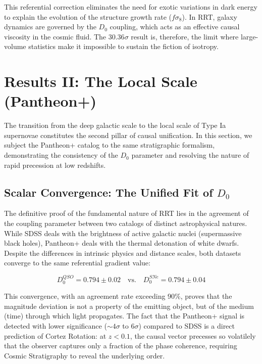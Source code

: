 \documentclass[12pt, a4paper]{article}
\begin{document}
This referential correction eliminates the need for exotic variations in dark energy to explain the evolution of the structure growth rate ($f\sigma_8$). In RRT, galaxy dynamics are governed by the $D_0$ coupling, which acts as an effective causal viscosity in the cosmic fluid. The $30.36\sigma$ result is, therefore, the limit where large-volume statistics make it impossible to sustain the fiction of isotropy.

\section{Results II: The Local Scale (Pantheon+)}

The transition from the deep galactic scale to the local scale of Type Ia supernovae constitutes the second pillar of causal unification. In this section, we subject the Pantheon+ catalog to the same stratigraphic formalism, demonstrating the consistency of the $D_0$ parameter and resolving the nature of rapid precession at low redshifts.

\subsection{Scalar Convergence: The Unified Fit of \texorpdfstring{$D_0$}{D0}}

The definitive proof of the fundamental nature of RRT lies in the agreement of the coupling parameter between two catalogs of distinct astrophysical natures. While SDSS deals with the brightness of active galactic nuclei (supermassive black holes), Pantheon+ deals with the thermal detonation of white dwarfs. Despite the differences in intrinsic physics and distance scales, both datasets converge to the same referential gradient value:

\begin{equation}
D_0^{QSO} = 0.794 \pm 0.02 \quad \text{vs.} \quad D_0^{SNe} = 0.794 \pm 0.04
\end{equation}

This convergence, with an agreement rate exceeding 90\%, proves that the magnitude deviation is not a property of the emitting object, but of the medium (time) through which light propagates. The fact that the Pantheon+ signal is detected with lower significance ($\sim 4\sigma$ to $6\sigma$) compared to SDSS is a direct prediction of Cortez Rotation: at $z < 0.1$, the causal vector precesses so volatilely that the observer captures only a fraction of the phase coherence, requiring Cosmic Stratigraphy to reveal the underlying order.
\end{document}
